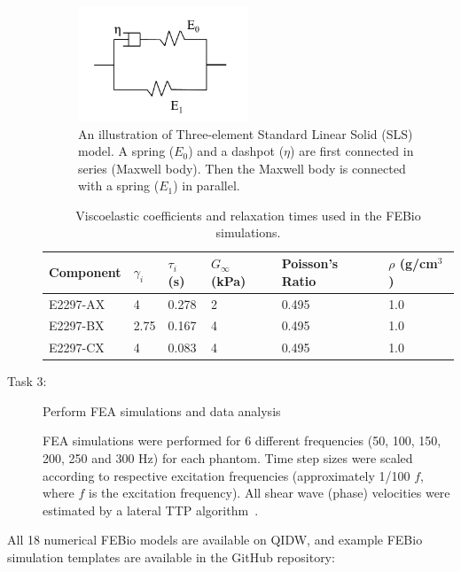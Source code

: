 \begin{description}
    \begin{figure}[htb!]
        \centering
        \includegraphics[width=0.5\textwidth]{figs/sls.png}
        \caption{An illustration of Three-element Standard Linear Solid (SLS)
        model. A spring ($E_0$) and a dashpot ($\eta$) are first connected in
        series (Maxwell body). Then the Maxwell body is connected with a spring
        ($E_1$) in parallel.}
    \label{fig:sls}
    \end{figure}

    \begin{table}\label{table:qlv}
        \centering
        \caption{Viscoelastic coefficients and relaxation times used in the
        FEBio simulations.}
        \begin{tabular}{|l|l|l|l|l|l|}
        \hline
        \textbf{Component} & \textbf{$\gamma_i$} & \textbf{$\tau_i$ (s)} & \textbf{$G_\infty$ (kPa)} & \textbf{Poisson's Ratio} & \textbf{$\rho$ (g/cm$^3$)}\\
        \hline
        E2297-AX & 4 & 0.278 & 2 & 0.495 & 1.0 \\
        E2297-BX & 2.75 & 0.167 & 4 & 0.495 & 1.0 \\
        E2297-CX & 4 & 0.083 & 4 & 0.495 & 1.0 \\
        \hline
        \end{tabular}
    \end{table}

    \item[Task 3:] Perform FEA simulations and data analysis

    FEA simulations were performed for 6 different frequencies (50, 100, 150,
    200, 250 and 300 Hz) for each phantom. Time step sizes were scaled
    according to respective excitation frequencies (approximately 1/100 $f$,
    where $f$ is the excitation frequency). All shear wave (phase) velocities
    were estimated by a lateral TTP algorithm~\cite{Pameri2008}.  

\end{description}

All 18 numerical FEBio models are available on QIDW, and example FEBio
simulation templates are available in the GitHub repository:

